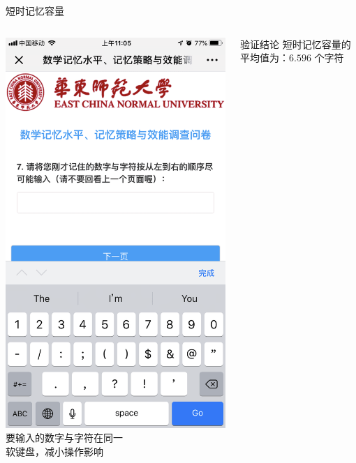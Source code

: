 \documentclass[serif]{beamer}
\begin{document}
\begin{frame}{短时记忆容量}
\begin{columns}
    	\includegraphics[scale=0.08]{test7.png}\\
    	\scriptsize {要输入的数字与字符在同一}\\
    	\scriptsize {软键盘，减小操作影响}
    	\begin{block}{验证结论}
    		短时记忆容量的平均值为：$ 6.596 $ 个字符
    	\end{block}    	
    \end{columns}            
    \end{frame}
    
\end{document}
